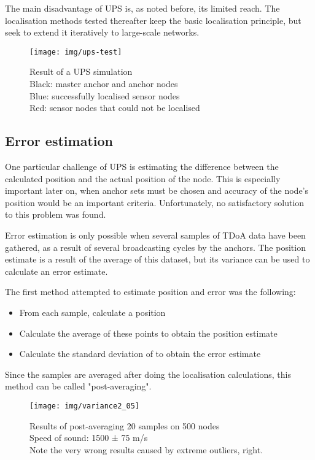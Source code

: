 \documentclass[12pt,a4paper,fleqn]{report}
\begin{document}
The main disadvantage of UPS is, as noted before, its limited reach. The localisation methods tested thereafter keep the basic localisation principle, but seek to extend it iteratively to large-scale networks.

\begin{figure}[h]
	\centering
	\texttt{[image: img/ups-test]}
	\caption{%
	Result of a UPS simulation \\
	Black: master anchor and anchor nodes \\
	Blue: successfully localised sensor nodes \\
	Red: sensor nodes that could not be localised \\
	}
\end{figure}

\subsection{Error estimation}

One particular challenge of UPS is estimating the difference between the calculated position and the actual position of the node. This is especially important later on, when anchor sets must be chosen and accuracy of the node's position would be an important criteria. Unfortunately, no satisfactory solution to this problem was found.

Error estimation is only possible when several samples of TDoA data have been gathered, as a result of several broadcasting cycles by the anchors. The position estimate is a result of the average of this dataset, but its variance can be used to calculate an error estimate.

The first method attempted to estimate position and error was the following:
\begin{itemize}
	\itemsep0em
	\item From each sample, calculate a position
	\item Calculate the average of these points to obtain the position estimate
	\item Calculate the standard deviation of to obtain the error estimate
\end{itemize}
Since the samples are averaged after doing the localisation calculations, this method can be called "post-averaging".

\begin{figure}[h]
	\centering
	\texttt{[image: img/variance2\_05]}
	\caption{%
	Results of post-averaging 20 samples on 500 nodes \\
	Speed of sound: 1500 ± 75 m/s \\
	Note the very wrong results caused by extreme outliers, right.
	}
\end{figure}
\end{document}
